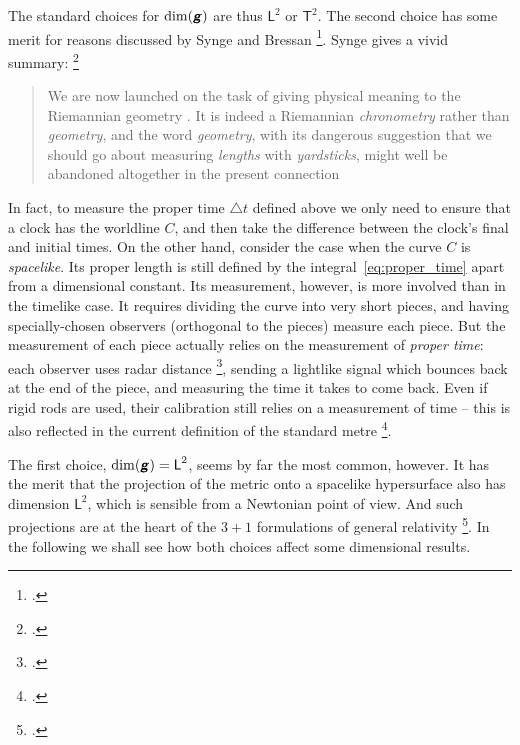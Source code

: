 \documentclass[\ifafour a4paper,12pt,\else a5paper,10pt,\fi%
onecolumn,oneside,article,%
british%
]{memoir}
\theoremstyle{remark}
\theoremstyle{innote}
\newcommand*{\mathte}[1]{\textbf{\textit{\textsf{#1}}}}
\newcommand*{\citep}{\footcites}
\newcommand*{\incr}{\triangle}%
\renewcommand*{\|}[1][]{\nonscript\,#1\vert\nonscript\;\mathopen{}}
\newcommand*{\sect}{\S}%
\newcommand*{\sects}{\S\S}%
\newcommand*{\chap}{ch.}%
\newcommand*{\Le}{\textsf{L}}
\newcommand*{\Ti}{\textsf{T}}
\newcommand*{\yg}{\mathte{g}}
\newcommand*{\inct}{\incr t}
\begin{document}
The standard choices for $\dim(\yg)$ are thus $\Le^{2}$ or $\Ti^{2}$. The
second choice has some merit for reasons discussed by Synge and Bressan
\citep[\sects~III.2--4]{synge1960b}[\sects~15, 18]{bressan1978}. Synge
gives a vivid summary: \citep[\sect~III.3 pp.~108--109]{synge1960b}
\begin{quote}\footnotesize
  We are now launched on the task of giving physical meaning to the
  Riemannian geometry \textelp{}. It is indeed a Riemannian
  \emph{chronometry} rather than \emph{geometry}, and the word
  \emph{geometry}, with its dangerous suggestion that we should go about
  measuring \emph{lengths} with \emph{yardsticks}, might well be abandoned
  altogether in the present connection
\end{quote}
In fact, to measure the proper time $\inct$ defined above we only need to
ensure that a clock has the worldline $C$, and then take the difference
between the clock's final and initial times. On the other hand, consider
the case when the curve $C$ is \emph{spacelike}. Its proper length is still
defined by the integral~\eqref{eq:proper_time} apart from a dimensional
constant. Its measurement, however, is more involved than in the timelike
case. It requires dividing the curve into very short pieces, and having
specially-chosen observers (orthogonal to the pieces) measure each piece.
But the measurement of each piece actually relies on the measurement of
\emph{proper time}: each observer uses radar distance
\citep[\chap~2]{frankel1979}[\sect~84]{landauetal1939_t1996}, sending a
lightlike signal which bounces back at the end of the piece, and measuring
the time it takes to come back. Even if rigid rods are used, their
calibration still relies on a measurement of time -- this is also reflected
in the current definition of the standard metre
\citep[p.~98]{bipm1983}[p.~25]{giacomo1984}.

The first choice, $\dim(\yg) = \Le^{2}$, seems by far the most common,
however. It has the merit that the projection of the metric onto a
spacelike hypersurface also has dimension $\Le^{2}$, which is sensible from
a Newtonian point of view. And such projections are at the heart of the
$3+1$ formulations of general relativity
\citep{gourgoulhon2007_r2012,alcubierre2008}[\chap~21]{misneretal1970_r1973}.
In the following we shall see how both choices affect some dimensional results.

\medskip
\end{document}

